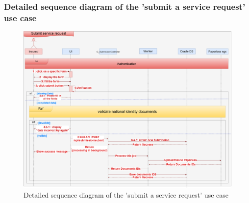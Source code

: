\subsubsection{Detailed sequence diagram of the 'submit a service request' use case}
\begin{figure}[h!]
    \centering
    \includegraphics[width=1\textwidth]{figures/det Submits a service request.png}
    \caption{Detailed sequence diagram of the 'submit a service request' use case}
\end{figure}
\clearpage

